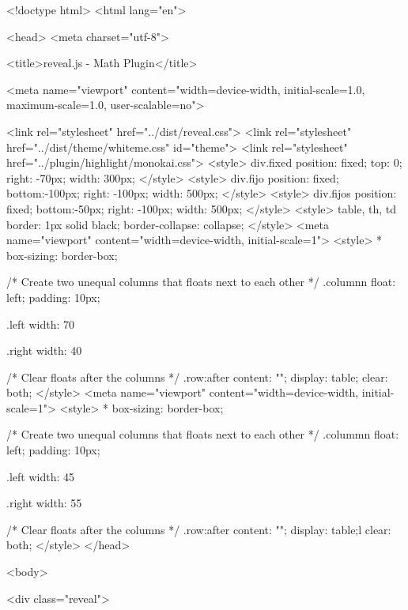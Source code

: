 <!doctype html>
<html lang="en">

 <head>
  <meta charset="utf-8">

  <title>reveal.js - Math Plugin</title>

  <meta name="viewport" content="width=device-width, initial-scale=1.0, maximum-scale=1.0, user-scalable=no">

  <link rel="stylesheet" href="../dist/reveal.css">
  <link rel="stylesheet" href="../dist/theme/whiteme.css" id="theme">
  	<link rel="stylesheet" href="../plugin/highlight/monokai.css">
  <style>
   div.fixed {
   position: fixed;
   top: 0;
   right: -70px;
   width: 300px;
   }
  </style>
  <style>
  div.fijo {
  position: fixed;
  bottom:-100px;
  right: -100px;
  width: 500px;
  }
 </style> 
  <style>
	div.fijos {
	position: fixed;
	bottom:-50px;
	right: -100px;
	width: 500px;
	}
</style>  
<style>
 table, th, td {
 border: 1px solid black;
 border-collapse: collapse;
 }
</style>
<meta name="viewport" content="width=device-width, initial-scale=1">
 <style>
  * {
  box-sizing: border-box;
  }
  
  /* Create two unequal columns that floats next to each other */
  .columnn {
  float: left;
  padding: 10px;
  }
  
  .left {
  width: 70%
  }
  
  .right {
  width: 40%
  }
  
  /* Clear floats after the columns */
  .row:after {
  content: "";
  display: table;
  clear: both;
  }
 </style>
<meta name="viewport" content="width=device-width, initial-scale=1">
 <style>
  * {
  box-sizing: border-box;
  }
  
  /* Create two unequal columns that floats next to each other */
  .colummn {
  float: left;
  padding: 10px;
  }
  
  .left {
  width: 45%
  }
  
  .right {
  width: 55%
  }
  
  /* Clear floats after the columns */
  .row:after {
  content: "";
  display: table;l
  clear: both;
  }
 </style>
 </head>

 <body>

  <div class="reveal">


